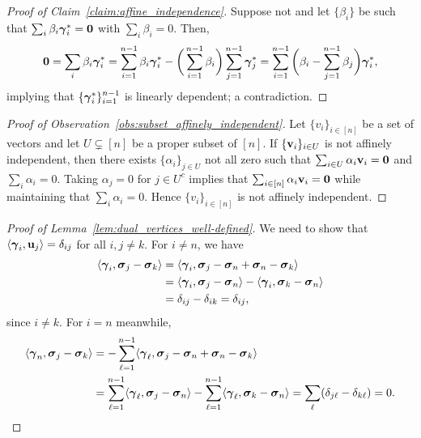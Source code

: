 \begin{proof}[Proof of Claim~\ref{claim:affine_independence}]
	Suppose not and let $\{\beta_i\}$ be such that $\sum_i \beta_i \vb*{\gamma}^*_i =\vb{0}$ with $\sum_i\beta_i=0$. Then, 
	\[\vb{0} = \sum_i\beta_i\vb*{\gamma}^*_i = \sum_{i=1}^{n-1} \beta_i \vb*{\gamma}^*_i - \bigg(\sum_{i=1}^{n-1} \beta_i\bigg)\sum_{j=1}^{n-1}\vb*{\gamma}^*_j = \sum_{i=1}^{n-1}\bigg(\beta_i-\sum_{j=1}^{n-1}\beta_j\bigg)\vb*{\gamma}^*_i,\]
	implying that $\{\vb*{\gamma}^*_i\}_{i=1}^{n-1}$ is linearly dependent; a contradiction.  
\end{proof}

\begin{proof}[Proof of Observation~\ref{obs:subset_affinely_independent}]
	Let $\{v_i\}_{i\in[n]}$ be a set of vectors and let $U\subsetneq[n]$ be a proper subset of $[n]$. If $\{\vb{v}_i\}_{i\in U}$ is not affinely independent, then there exists $\{\alpha_i\}_{j\in U}$ not all zero such that $\sum_{i\in U}\alpha_i\vb{v}_i=\vb{0}$ and $\sum_i\alpha_i=0$. Taking $\alpha_j=0$ for $j\in U^c$ implies that $\sum_{i\in[n]}\alpha_i\vb{v}_i=\vb{0}$ while maintaining that $\sum_{i}\alpha_i=0$. Hence $\{v_i\}_{i\in[n]}$ is not affinely independent. 
\end{proof}

\begin{proof}[Proof of Lemma~\ref{lem:dual_vertices_well-defined}]
	We need to show that $\langle \vb*{\gamma}_i,\vb{u}_j\rangle = \delta_{ij}$ for all $i,j\neq k$. For $i\neq n$, we have 
	\begin{align*}
	\langle \vb*{\gamma}_i, \vb*{\sigma}_j-\vb*{\sigma}_k\rangle &= \langle \vb*{\gamma}_i,\vb*{\sigma}_j-\vb*{\sigma}_n+\vb*{\sigma}_n-\vb*{\sigma}_k\rangle \\
	&= \langle \vb*{\gamma}_i,\vb*{\sigma}_j-\vb*{\sigma}_n \rangle - \langle \vb*{\gamma}_i,\vb*{\sigma}_k-\vb*{\sigma}_n\rangle \\
	&= \delta_{ij} - \delta_{ik} = \delta_{ij},
	\end{align*}
	since $i\neq k$. For $i=n$ meanwhile, 
	\begin{align*}
	\langle \vb*{\gamma}_n,\vb*{\sigma}_j-\vb*{\sigma}_k\rangle &= -\sum_{\ell=1}^{n-1}\langle \vb*{\gamma}_\ell,\vb*{\sigma}_j-\vb*{\sigma}_n+\vb*{\sigma}_n-\vb*{\sigma}_k\rangle \\
	&= \sum_{\ell=1}^{n-1}\langle \vb*{\gamma}_\ell,\vb*{\sigma}_j-\vb*{\sigma}_n\rangle - \sum_{\ell=1}^{n-1}\langle  \vb*{\gamma}_\ell,\vb*{\sigma}_k-\vb*{\sigma}_n\rangle =\sum_{\ell}(\delta_{j\ell}-\delta_{k\ell})=0. \qedhere
	\end{align*}
\end{proof}


